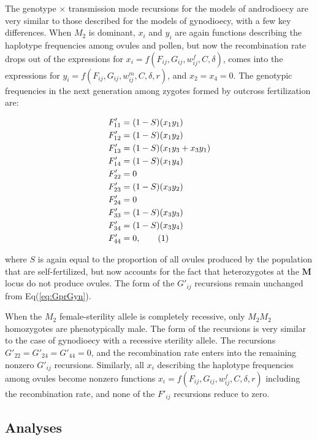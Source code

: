 \documentclass[9pt,twocolumn,twoside,lineno]{gsajnl}
\newcommand\numberthis{\addtocounter{equation}{1}\tag{\theequation}}
\begin{document}
The genotype $\times$ transmission mode recursions for the models of androdioecy are very similar to those described for the models of gynodioecy, with a few key differences. When $M_2$ is dominant, $x_{i}$ and $y_{i}$ are again functions describing the haplotype frequencies among ovules and pollen, but now the recombination rate drops out of the expressions for $x_i=f(F_{ij},G_{ij},w^f_{ij},C,\delta)$, comes into the expressions for $y_i=f(F_{ij},G_{ij},w^m_{ij},C,\delta,r)$, and $x_2=x_4=0$. The genotypic frequencies in the next generation among zygotes formed by outcross fertilization are:
\begin{linenomath}\begin{align*} \label{eq:FprAnd}
    F'_{11} &= (1 - S) (x_1 y_1) \\
    F'_{12} &= (1 - S) (x_1 y_2) \\
    F'_{13} &= (1 - S) (x_1 y_3 + x_3 y_1) \\
    F'_{14} &= (1 - S) (x_1 y_4) \\
    F'_{22} &= 0 \\
    F'_{23} &= (1 - S) (x_3 y_2) \\
    F'_{24} &= 0 \\
    F'_{33} &= (1 - S) (x_3 y_3) \\
    F'_{34} &= (1 - S) (x_3 y_4) \\
    F'_{44} &= 0, \numberthis
\end{align*} \end{linenomath}

\noindent where $S$ is again equal to the proportion of all ovules produced by the population that are self-fertilized, but now accounts for the fact that heterozygotes at the $\mathbf{M}$ locus do not produce ovules. The form of the $G'_{ij}$ recursions remain unchanged from Eq(\ref{eq:GprGyn}).

When the $M_2$ female-sterility allele is completely recessive, only $M_2M_2$ homozygotes are phenotypically male. The form of the recursions is very similar to the case of gynodioecy with a recessive sterility allele. The recursions $G'_{22}=G'_{24}=G'_{44}=0$, and the recombination rate enters into the remaining nonzero $G'_{ij}$ recursions. Similarly, all $x_i$ describing the haplotype frequencies among ovules become nonzero functions $x_i=f(F_{ij},G_{ij},w^f_{ij},C,\delta,r)$ including the recombination rate, and none of the $F'_{ij}$ recursions reduce to zero.


\subsection{Analyses} \label{subsec:analyses}
\end{document}
